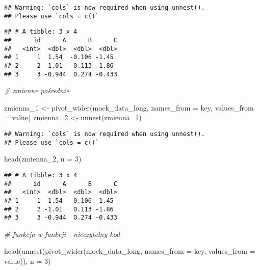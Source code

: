 \documentclass[
]{book}
\newenvironment{Shaded}{\begin{snugshade}}{\end{snugshade}}
\newcommand{\AttributeTok}[1]{\textcolor[rgb]{0.77,0.63,0.00}{#1}}
\newcommand{\CommentTok}[1]{\textcolor[rgb]{0.56,0.35,0.01}{\textit{#1}}}
\newcommand{\DecValTok}[1]{\textcolor[rgb]{0.00,0.00,0.81}{#1}}
\newcommand{\FunctionTok}[1]{\textcolor[rgb]{0.00,0.00,0.00}{#1}}
\newcommand{\NormalTok}[1]{#1}
\newcommand{\OtherTok}[1]{\textcolor[rgb]{0.56,0.35,0.01}{#1}}
\begin{document}
\begin{verbatim}
## Warning: `cols` is now required when using unnest().
## Please use `cols = c()`
\end{verbatim}

\begin{verbatim}
## # A tibble: 3 x 4
##      id      A      B      C
##   <int>  <dbl>  <dbl>  <dbl>
## 1     1  1.54  -0.106 -1.45 
## 2     2 -1.01   0.113 -1.86 
## 3     3 -0.944  0.274 -0.433
\end{verbatim}

\begin{Shaded}
\begin{Highlighting}[]
\CommentTok{\# zmienne pośrednie}

\NormalTok{zmienna\_1 }\OtherTok{\textless{}{-}} \FunctionTok{pivot\_wider}\NormalTok{(mock\_data\_long, }\AttributeTok{names\_from =}\NormalTok{ key, }\AttributeTok{values\_from =}\NormalTok{ value) }
\NormalTok{zmienna\_2 }\OtherTok{\textless{}{-}} \FunctionTok{unnest}\NormalTok{(zmienna\_1)}
\end{Highlighting}
\end{Shaded}

\begin{verbatim}
## Warning: `cols` is now required when using unnest().
## Please use `cols = c()`
\end{verbatim}

\begin{Shaded}
\begin{Highlighting}[]
\FunctionTok{head}\NormalTok{(zmienna\_2, }\AttributeTok{n =} \DecValTok{3}\NormalTok{)}
\end{Highlighting}
\end{Shaded}

\begin{verbatim}
## # A tibble: 3 x 4
##      id      A      B      C
##   <int>  <dbl>  <dbl>  <dbl>
## 1     1  1.54  -0.106 -1.45 
## 2     2 -1.01   0.113 -1.86 
## 3     3 -0.944  0.274 -0.433
\end{verbatim}

\begin{Shaded}
\begin{Highlighting}[]
\CommentTok{\# funkcja w funkcji {-} nieczytelny kod}

\FunctionTok{head}\NormalTok{(}\FunctionTok{unnest}\NormalTok{(}\FunctionTok{pivot\_wider}\NormalTok{(mock\_data\_long, }\AttributeTok{names\_from =}\NormalTok{ key, }\AttributeTok{values\_from =}\NormalTok{ value)), }\AttributeTok{n =} \DecValTok{3}\NormalTok{)}
\end{Highlighting}
\end{Shaded}
\end{document}
